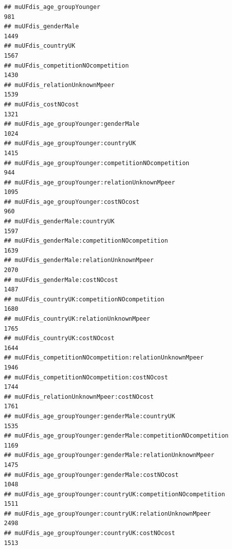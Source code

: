 \documentclass[
]{article}
\begin{document}
\begin{verbatim}
## muUFdis_age_groupYounger                                                               981
## muUFdis_genderMale                                                                    1449
## muUFdis_countryUK                                                                     1567
## muUFdis_competitionNOcompetition                                                      1430
## muUFdis_relationUnknownMpeer                                                          1539
## muUFdis_costNOcost                                                                    1321
## muUFdis_age_groupYounger:genderMale                                                   1024
## muUFdis_age_groupYounger:countryUK                                                    1415
## muUFdis_age_groupYounger:competitionNOcompetition                                      944
## muUFdis_age_groupYounger:relationUnknownMpeer                                         1095
## muUFdis_age_groupYounger:costNOcost                                                    960
## muUFdis_genderMale:countryUK                                                          1597
## muUFdis_genderMale:competitionNOcompetition                                           1639
## muUFdis_genderMale:relationUnknownMpeer                                               2070
## muUFdis_genderMale:costNOcost                                                         1487
## muUFdis_countryUK:competitionNOcompetition                                            1680
## muUFdis_countryUK:relationUnknownMpeer                                                1765
## muUFdis_countryUK:costNOcost                                                          1644
## muUFdis_competitionNOcompetition:relationUnknownMpeer                                 1946
## muUFdis_competitionNOcompetition:costNOcost                                           1744
## muUFdis_relationUnknownMpeer:costNOcost                                               1761
## muUFdis_age_groupYounger:genderMale:countryUK                                         1535
## muUFdis_age_groupYounger:genderMale:competitionNOcompetition                          1169
## muUFdis_age_groupYounger:genderMale:relationUnknownMpeer                              1475
## muUFdis_age_groupYounger:genderMale:costNOcost                                        1048
## muUFdis_age_groupYounger:countryUK:competitionNOcompetition                           1511
## muUFdis_age_groupYounger:countryUK:relationUnknownMpeer                               2498
## muUFdis_age_groupYounger:countryUK:costNOcost                                         1513

\end{verbatim}
\end{document}
